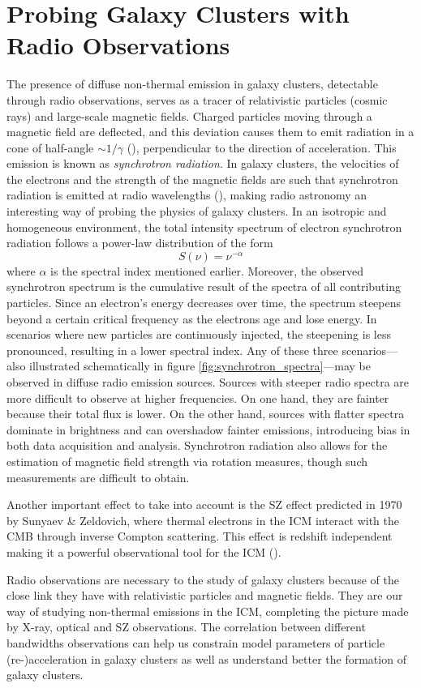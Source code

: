 \documentclass[11pt,letterpaper]{article}
\begin{document}
\section{Probing Galaxy Clusters with Radio Observations}  \label{sec:radio}
The presence of diffuse non-thermal emission in galaxy clusters, detectable through radio observations, serves as a tracer of relativistic particles (cosmic rays) and large-scale magnetic fields. Charged particles moving through a magnetic field are deflected, and this deviation causes them to emit radiation in a cone of half-angle $\sim 1/\gamma$ (\cite{favart_1ere_2023}), perpendicular to the direction of acceleration. This emission is known as \textit{synchrotron radiation}. In galaxy clusters, the velocities of the electrons and the strength of the magnetic fields are such that synchrotron radiation is emitted at radio wavelengths (\cite{pizzo_tomography_2010}), making radio astronomy an interesting way of probing the physics of galaxy clusters. In an isotropic and homogeneous environment, the total intensity spectrum of electron synchrotron radiation follows a power-law distribution of the form
\begin{equation}
	S(\nu) = \nu^{-\alpha}
\end{equation}
where $\alpha$ is the spectral index mentioned earlier. Moreover, the observed synchrotron spectrum is the cumulative result of the spectra of all contributing particles. Since an electron’s energy decreases over time, the spectrum steepens beyond a certain critical frequency as the electrons age and lose energy. In scenarios where new particles are continuously injected, the steepening is less pronounced, resulting in a lower spectral index. Any of these three scenarios—also illustrated schematically in figure \ref{fig:synchrotron_spectra}—may be observed in diffuse radio emission sources. Sources with steeper radio spectra are more difficult to observe at higher frequencies. On one hand, they are fainter because their total flux is lower. On the other hand, sources with flatter spectra dominate in brightness and can overshadow fainter emissions, introducing bias in both data acquisition and analysis. Synchrotron radiation also allows for the estimation of magnetic field strength via rotation measures, though such measurements are difficult to obtain.
\medskip
\par Another important effect to take into account is the SZ effect predicted in 1970 by Sunyaev \& Zeldovich, where thermal electrons in the ICM interact with the CMB through inverse Compton scattering. This effect is redshift independent making it a powerful observational tool for the ICM (\cite{van_weeren_diffuse_2019}).
\medskip
\par Radio observations are necessary to the study of galaxy clusters because of the close link they have with relativistic particles and magnetic fields. They are our way of studying non-thermal emissions in the ICM, completing the picture made by X-ray, optical and SZ observations. The correlation between different bandwidths observations can help us constrain model parameters of particle (re-)acceleration in galaxy clusters as well as understand better the formation of galaxy clusters.
\end{document}
